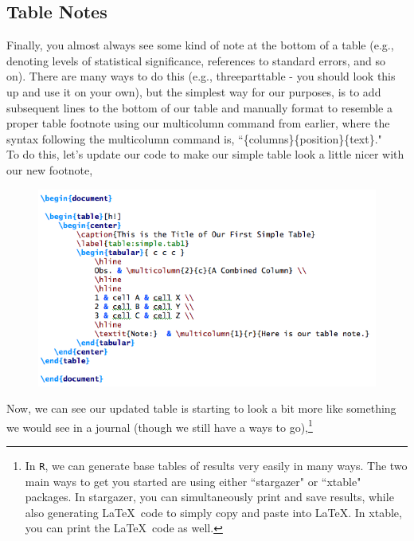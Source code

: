\documentclass[11pt]{article}
\newcommand{\forceindent}{\leavevmode{\parindent=1.5em\indent}} %
\begin{document}
\subsection{Table Notes}

\forceindent Finally, you almost always see some kind of note at the bottom of a table (e.g., denoting levels of statistical significance, references to standard errors, and so on). There are many ways to do this (e.g., threeparttable - you should look this up and use it on your own), but the simplest way for our purposes, is to add subsequent lines to the bottom of our table and manually format to resemble a proper table footnote using our multicolumn command from earlier, where the syntax following the multicolumn command is, ``\{columns\}\{position\}\{text\}." \\

To do this, let's update our code to make our simple table look a little nicer with our new footnote,

\begin{figure}[!h]
	\includegraphics[scale=.5]{CODE8} \\ %
\end{figure}

\newpage

Now, we can see our updated table is starting to look a bit more like something we would see in a journal (though we still have a ways to go),\footnote{In \texttt{R}, we can generate base tables of results very easily in many ways. The two main ways to get you started are using either ``stargazer" or ``xtable" packages. In stargazer, you can simultaneously print and save results, while also generating \LaTeX\ code to simply copy and paste into \LaTeX. In xtable, you can print the \LaTeX\ code as well.}
\end{document}
